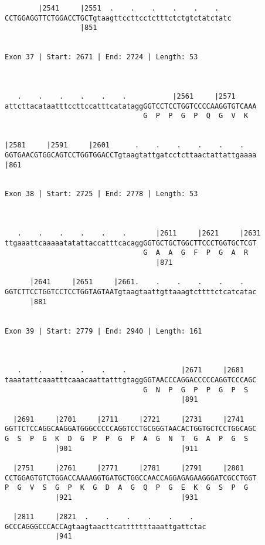 \documentclass{article}
\begin{document}
\begin{Verbatim}
        |2541     |2551  .    .    .    .    .    .   
CCTGGAGGTTCTGGACCTGCTgtaagttccttcctctttctctgtctatctatc
                  |851                                
  
 
Exon 37 | Start: 2671 | End: 2724 | Length: 53



   .    .    .    .    .    .           |2561     |2571     
attcttacataatttccttccatttcatataggGGTCCTCCTGGTCCCCAAGGTGTCAAA
                                 G  P  P  G  P  Q  G  V  K  
                                                            
  
|2581     |2591     |2601      .    .    .    .    .    .   
GGTGAACGTGGCAGTCCTGGTGGACCTgtaagtattgatcctcttaactattattgaaaa
|861                                                        
  
 
Exon 38 | Start: 2725 | End: 2778 | Length: 53



   .    .    .    .    .    .       |2611     |2621     |2631
ttgaaattcaaaaatatattaccatttcacaggGGTGCTGCTGGCTTCCCTGGTGCTCGT
                                 G  A  A  G  F  P  G  A  R  
                                    |871                    
  
      |2641     |2651     |2661.    .    .    .    .    .   
GGTCTTCCTGGTCCTCCTGGTAGTAATgtaagtaattgttaaagtcttttctcatcatac
      |881                                                  
  
 
Exon 39 | Start: 2779 | End: 2940 | Length: 161



   .    .    .    .    .    .             |2671     |2681   
taaatattcaaatttcaaacaattatttgtaggGGTAACCCAGGACCCCCAGGTCCCAGC
                                 G  N  P  G  P  P  G  P  S  
                                          |891              
  
  |2691     |2701     |2711     |2721     |2731     |2741   
GGTTCTCCAGGCAAGGATGGGCCCCCAGGTCCTGCGGGTAACACTGGTGCTCCTGGCAGC
G  S  P  G  K  D  G  P  P  G  P  A  G  N  T  G  A  P  G  S  
            |901                          |911              
  
  |2751     |2761     |2771     |2781     |2791     |2801   
CCTGGAGTGTCTGGACCAAAAGGTGATGCTGGCCAACCAGGAGAGAAGGGATCGCCTGGT
P  G  V  S  G  P  K  G  D  A  G  Q  P  G  E  K  G  S  P  G  
            |921                          |931              
  
  |2811     |2821  .    .    .    .    .    .   
GCCCAGGGCCCACCAgtaagtaacttcatttttttaaattgattctac
            |941                                
  

\end{Verbatim}
\end{document}
